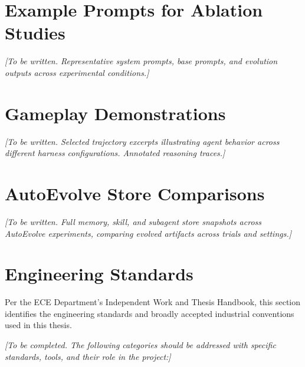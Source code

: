 \section{Example Prompts for Ablation Studies}\label{sec:appendix_prompts}

\textit{[To be written. Representative system prompts, base prompts, and evolution outputs across experimental conditions.]}

\section{Gameplay Demonstrations}\label{sec:appendix_gameplay}

\textit{[To be written. Selected trajectory excerpts illustrating agent behavior across different harness configurations. Annotated reasoning traces.]}

\section{AutoEvolve Store Comparisons}\label{sec:appendix_stores}

\textit{[To be written. Full memory, skill, and subagent store snapshots across AutoEvolve experiments, comparing evolved artifacts across trials and settings.]}

\section{Engineering Standards}\label{sec:appendix_engineering_standards}

Per the ECE Department's Independent Work and Thesis Handbook, this section identifies the engineering standards and broadly accepted industrial conventions used in this thesis.

\textit{[To be completed. The following categories should be addressed with specific standards, tools, and their role in the project:]}


